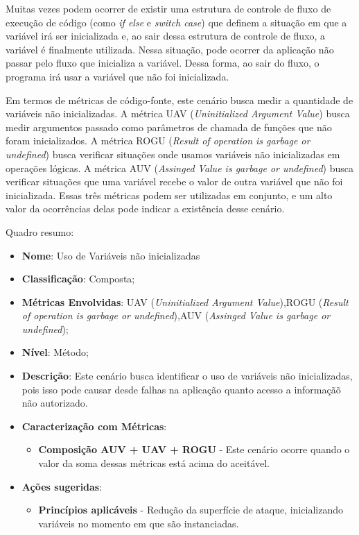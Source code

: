 Muitas vezes podem ocorrer de existir uma estrutura de controle de fluxo de execução de código (como \emph{if else} e \emph{switch case}) que definem a situação em que a variável irá ser inicializada e, ao sair dessa estrutura de controle de fluxo, a variável é finalmente utilizada. Nessa situação, pode ocorrer da aplicação não passar pelo fluxo que inicializa a variável. Dessa forma, ao sair do fluxo, o programa irá usar a variável que não foi inicializada.

Em termos de métricas de código-fonte, este cenário busca medir a quantidade de variáveis não inicializadas. A métrica UAV (\emph{Uninitialized Argument Value}) busca medir argumentos passado como parâmetros de chamada de funções que não foram inicializados. A métrica ROGU (\emph{Result of operation is garbage or undefined}) busca verificar situações onde usamos variáveis não inicializadas em operações lógicas. A métrica AUV (\emph{Assinged Value is garbage or undefined}) busca verificar situações que uma variável recebe o valor de outra variável que não foi inicializada. Essas três métricas podem ser utilizadas em conjunto, e um alto valor da ocorrências delas pode indicar a existência desse cenário.

Quadro resumo:

\begin{itemize}
\item \textbf{Nome}: Uso de Variáveis não inicializadas
\item \textbf{Classificação}: Composta;
\item \textbf{Métricas Envolvidas}: UAV (\emph{Uninitialized Argument Value}),ROGU (\emph{Result of operation is garbage or undefined}),AUV (\emph{Assinged Value is garbage or undefined});
\item \textbf{Nível}: Método;
\item \textbf{Descrição}: Este cenário busca identificar o uso de variáveis não inicializadas, pois isso pode causar desde falhas na aplicação quanto acesso a informaçãõ não autorizado.
\item \textbf{Caracterização com Métricas}: 
	\begin{itemize}
	\item \textbf{Composição AUV + UAV + ROGU} - Este cenário ocorre quando o valor da soma dessas métricas está acima do aceitável.
	\end{itemize}
\item \textbf{Ações sugeridas}: 
	\begin{itemize}
	\item \textbf{Princípios aplicáveis} - Redução da superfície de ataque, inicializando variáveis no momento em que são instanciadas.
	\end{itemize}
\end{itemize}


